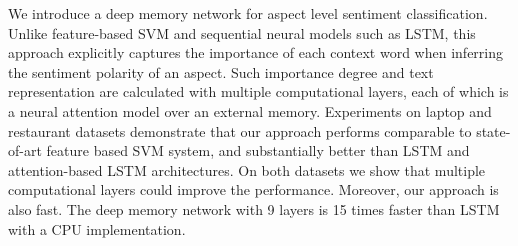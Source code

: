 We introduce a deep memory network for aspect level sentiment classification. Unlike feature-based SVM and sequential neural models such as LSTM, this approach explicitly captures the importance of each context word when inferring the sentiment polarity of an aspect. Such importance degree and text representation are calculated with multiple computational layers, each of which is a neural attention model over an external memory. Experiments on laptop and restaurant datasets demonstrate that our approach performs comparable to state-of-art feature based SVM system, and substantially better than LSTM and attention-based LSTM architectures. On both datasets we show that multiple computational layers could improve the performance. Moreover, our approach is also fast. The deep memory network with 9 layers is 15 times faster than LSTM with a CPU implementation.
